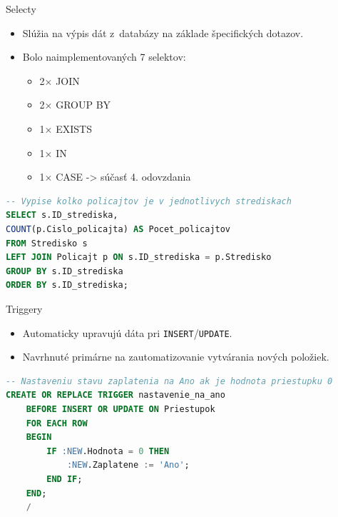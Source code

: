 \documentclass[10pt, hyperref={unicode}]{beamer}
\begin{document}
\begin{frame}[fragile]{Selecty}
    \begin{itemize}
        \item Slúžia na výpis dát z~databázy na základe špecifických dotazov.
        \item Bolo naimplementovaných 7 selektov:
        \begin{itemize}
            \item 2× JOIN
            \item 2× GROUP BY
            \item 1× EXISTS
            \item 1× IN
            \item 1× CASE -> súčasť 4. odovzdania
        \end{itemize}
    \end{itemize}
    \begin{lstlisting}[language=SQL, title={~}]
-- Vypise kolko policajtov je v jednotlivych strediskach
SELECT s.ID_strediska, 
COUNT(p.Cislo_policajta) AS Pocet_policajtov
FROM Stredisko s
LEFT JOIN Policajt p ON s.ID_strediska = p.Stredisko
GROUP BY s.ID_strediska
ORDER BY s.ID_strediska;
    \end{lstlisting}
\end{frame}


\begin{frame}[fragile]{Triggery}
    \begin{itemize}
        \item Automaticky upravujú dáta pri \texttt{INSERT}/\texttt{UPDATE}.
        \item Navrhnuté primárne na zautomatizovanie vytvárania nových položiek.
    \end{itemize}
    \begin{lstlisting}[language=SQL, title={~}]
-- Nastaveniu stavu zaplatenia na Ano ak je hodnota priestupku 0
CREATE OR REPLACE TRIGGER nastavenie_na_ano
    BEFORE INSERT OR UPDATE ON Priestupok
    FOR EACH ROW
    BEGIN
        IF :NEW.Hodnota = 0 THEN
            :NEW.Zaplatene := 'Ano';
        END IF;
    END;
    /
    \end{lstlisting}
\end{frame}
\end{document}
